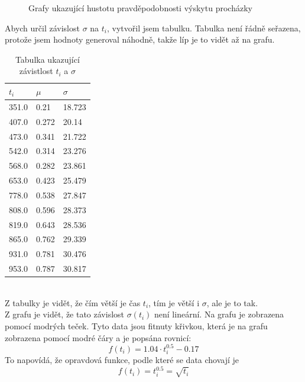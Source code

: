 \documentclass{article}
\begin{document}
\begin{figure}
\begin{subfigure}{.3\textwidth}
\end{subfigure}
\newline

\caption{Grafy ukazující hustotu pravděpodobnosti výskytu procházky}
\end{figure}

\newpage
Abych určil závislost $\sigma$ na $t_{i}$, vytvořil jsem tabulku.
Tabulka není řádně seřazena, protože jsem hodnoty generoval náhodně,
takže líp je to vidět až na grafu.

\begin{table}[!ht]
    \centering
    \begin{tabular}{|l|l|l|}
    \hline
        $t_{i}$ & $\mu$ & $\sigma$ \\ \hline
        351.0 & 0.21 & 18.723 \\ \hline
        407.0 & 0.272 & 20.14 \\ \hline
        473.0 & 0.341 & 21.722 \\ \hline
        542.0 & 0.314 & 23.276 \\ \hline
        568.0 & 0.282 & 23.861 \\ \hline
        653.0 & 0.423 & 25.479 \\ \hline
        778.0 & 0.538 & 27.847 \\ \hline
        808.0 & 0.596 & 28.373 \\ \hline
        819.0 & 0.643 & 28.536 \\ \hline
        865.0 & 0.762 & 29.339 \\ \hline
        931.0 & 0.781 & 30.476 \\ \hline
        953.0 & 0.787 & 30.817 \\ \hline
    \end{tabular}
    \caption{Tabulka ukazující závistlost $t_{i}$ a $\sigma$}
  \end{table}

  \\
  Z tabulky je vidět, že čím větší je čas $t_{i}$, tím je větší i $\sigma$, ale je to tak.\\
  \newpage
  Z grafu je vidět, že tato závislost $\sigma(t_{i})$ není lineární.
  Na grafu je zobrazena pomocí modrých teček.
  Tyto data jsou fitnuty křivkou, která je na grafu zobrazena pomocí
  modré čáry a je popsána rovnicí:
  $$f(t_{i}) = 1.04 \cdot t_{i}^{0.5} - 0.17$$
  To napovídá, že opravdová funkce, podle které se data chovají je
  $$f(t_{i}) = t_{i}^{0.5} = \sqrt{t_{i}}$$
\end{document}
